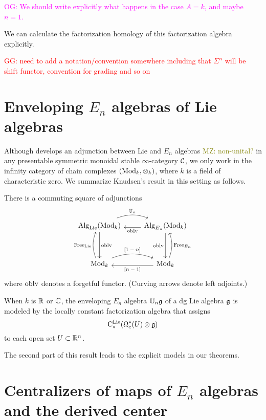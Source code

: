 \documentclass[11pt]{amsart}
\numberwithin{equation}{section}
\def\owen{\textcolor{magenta}{OG: }\textcolor{magenta}}
\def\mahmoud{\textcolor{olive}{MZ: }\textcolor{olive}}
\def\greg{\textcolor{red}{GG: }\textcolor{red}}
\begin{document}
\owen{We should write explicitly what happens in the case $A = k$, and maybe $n=1$.}

We can calculate the factorization homology of this factorization algebra explicitly.

\greg{need to add a notation/convention somewhere including that $\Sigma^n$ will be shift functor, convention for grading and so on}
\section{Enveloping $E_n$ algebras of Lie algebras}

Although \cite{Knudsen} develops an adjunction between Lie and $E_n$ algebras \mahmoud{non-unital?} in any presentable symmetric monoidal stable $\infty$-category $\mathcal C$,
we only work in the infinity category of chain complexes $({\rm Mod}_k, \otimes_k)$, where $k$ is a field of characteristic zero. We summarize Knudsen's result in this setting as follows.




\def\oblv{{\rm oblv}}
\def\Free{{\rm Free}}

\begin{thm}
There is a commuting square of adjunctions
\[
\begin{tikzcd}
\Alg_\Lie(\Mod_k) \arrow[r, bend left=20, shift left=.5ex,"\UU_n"] \arrow[dd, "\oblv"] & \Alg_{E_n}(\Mod_k) \arrow[l, shift left=.5ex, "\oblv"] \arrow[dd, swap, "\oblv"]\\
&\\
\Mod_k \arrow[r, bend left=20, shift left=.5ex, "\text{$[1-n]$}"] \arrow[uu, bend left=20, shift left=.5ex, "\Free_\Lie"] & \Mod_k \arrow[l, shift left=.5ex, "\text{$[n-1]$}"] \arrow[uu, bend right=20, shift right=.5ex, "\Free_{E_n}"']
\end{tikzcd}
\]
where $\oblv$ denotes a forgetful functor.
(Curving arrows denote left adjoints.)

When $k$ is $\mathbb R$ or $\mathbb C$, 
the enveloping $E_n$ algebra $\mathbb U_n \mathfrak g$ of a dg Lie algebra $\mathfrak g$ is modeled by the locally constant factorization algebra that assigns
\[
{\rm C}^{\rm Lie}_*(\Omega^*_c(U) \otimes \mathfrak g)
\]
to each open set $U \subset \mathbb R^n$.
\end{thm}

The second part of this result leads to the explicit models in our theorems.

\section{Centralizers of maps of $E_n$ algebras and the derived center}
\label{sec: centralizer}
\end{document}
